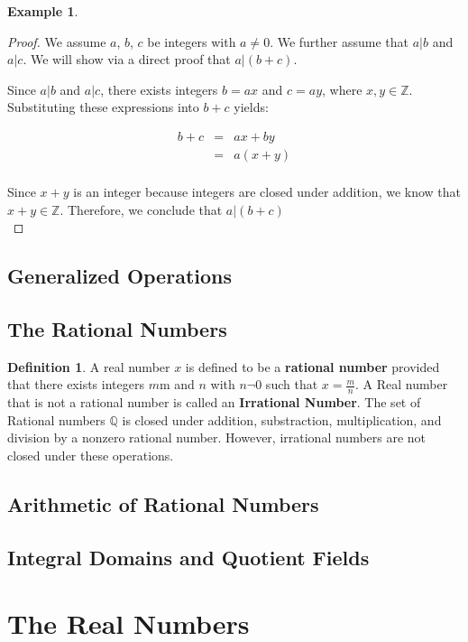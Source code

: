 \documentclass{book}
\theoremstyle{definition}
\newtheorem{definition}{Definition}[section]
\newtheorem{example}{Example}[definition]
\theoremstyle{remark}
\newcommand{\bb}[1]{\mathbb{#1}}
\begin{document}
\begin{example}
\begin{proof}
    We assume $a$, $b$, $c$ be integers with $a \neq 0$. We further assume that $a | b$ and $a | c$. We will show via a direct proof that $a | (b + c)$. 
    
    Since $a | b$ and $a | c$, there exists integers $b = ax$ and $c = ay$, where $x, y \in \bb{Z}$. Substituting these expressions into $b + c$ yields:
    
    \begin{eqnarray*}
    	b + c & = & ax + by \nonumber \\	
    	& = & a(x + y) \nonumber \\
    \end{eqnarray*}
    
    Since $x + y$ is an integer because integers are closed under addition, we know that $x + y \in \bb{Z}$. Therefore, we conclude that $a | (b + c)$ \\
\end{proof}
\end{example}


\newpage
\subsection{Generalized Operations}
\subsection{The Rational Numbers}
\begin{definition}
A real number $x$ is defined to be a {\bf rational number} provided that there exists integers $m$m and $n$ with $n \neg 0$ such that $x = \frac{m}{n}$. A Real number that is not a rational number is called an {\bf Irrational Number}. The set of Rational numbers $\mathbb{Q}$ is closed under addition, substraction, multiplication, and division by a nonzero rational number. However, irrational numbers are not closed under these operations. 
\end{definition}


\subsection{Arithmetic of Rational Numbers}
\subsection{Integral Domains and Quotient Fields}

\newpage
\section{The Real Numbers}
\end{document}
